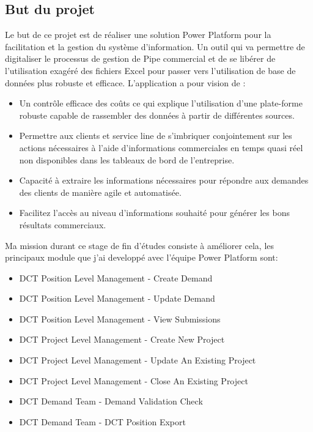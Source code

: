 \subsection{But du projet}

Le but de ce projet est de réaliser une solution Power Platform pour la facilitation et la gestion du système d’information. Un outil qui va permettre de digitaliser le processus de gestion de Pipe commercial et de se libérer de l’utilisation exagéré des fichiers Excel pour passer vers l’utilisation de base de données plus robuste et efficace. L’application a pour vision de :  
\\

\begin{itemize}
  \item Un contrôle efficace des coûts ce qui explique l'utilisation d'une plate-forme robuste capable de rassembler des données à partir de différentes sources.
  \item Permettre aux clients et service line de s'imbriquer conjointement sur les actions nécessaires à l'aide d'informations commerciales en temps quasi réel non disponibles dans les tableaux de bord de l'entreprise.
  \item Capacité à extraire les informations nécessaires pour répondre aux demandes des clients de manière agile et automatisée.
  \item Facilitez l'accès au niveau d'informations souhaité pour générer les bons résultats commerciaux.
\end{itemize}

Ma mission durant ce stage de fin d’études consiste à améliorer cela, les principaux module que j'ai developpé avec l'équipe Power Platform sont:
\\
\begin{itemize}
  \item DCT Position Level Management - Create Demand
  \item DCT Position Level Management - Update Demand
  \item DCT Position Level Management - View Submissions
  \item DCT Project Level Management - Create New Project
  \item DCT Project Level Management - Update An Existing Project
  \item DCT Project Level Management - Close An Existing Project
  \item DCT Demand Team - Demand Validation Check
  \item DCT Demand Team - DCT Position Export
\end{itemize}


